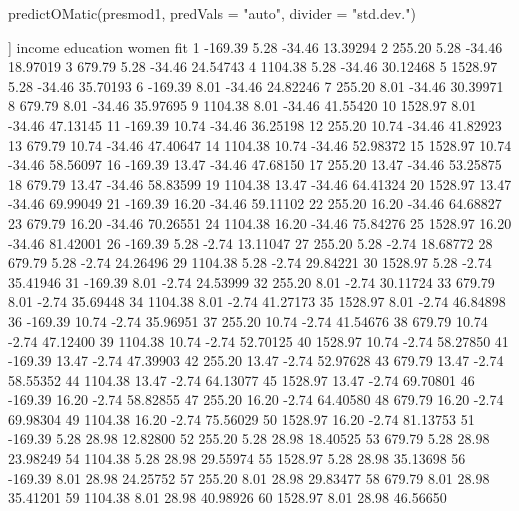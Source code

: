 \begin{Schunk}
\begin{Sinput}
 predictOMatic(presmod1, predVals = "auto", divider = "std.dev.")
\end{Sinput}
\begin{Soutput}
[[1]]
     income education  women      fit
1   -169.39      5.28 -34.46 13.39294
2    255.20      5.28 -34.46 18.97019
3    679.79      5.28 -34.46 24.54743
4   1104.38      5.28 -34.46 30.12468
5   1528.97      5.28 -34.46 35.70193
6   -169.39      8.01 -34.46 24.82246
7    255.20      8.01 -34.46 30.39971
8    679.79      8.01 -34.46 35.97695
9   1104.38      8.01 -34.46 41.55420
10  1528.97      8.01 -34.46 47.13145
11  -169.39     10.74 -34.46 36.25198
12   255.20     10.74 -34.46 41.82923
13   679.79     10.74 -34.46 47.40647
14  1104.38     10.74 -34.46 52.98372
15  1528.97     10.74 -34.46 58.56097
16  -169.39     13.47 -34.46 47.68150
17   255.20     13.47 -34.46 53.25875
18   679.79     13.47 -34.46 58.83599
19  1104.38     13.47 -34.46 64.41324
20  1528.97     13.47 -34.46 69.99049
21  -169.39     16.20 -34.46 59.11102
22   255.20     16.20 -34.46 64.68827
23   679.79     16.20 -34.46 70.26551
24  1104.38     16.20 -34.46 75.84276
25  1528.97     16.20 -34.46 81.42001
26  -169.39      5.28  -2.74 13.11047
27   255.20      5.28  -2.74 18.68772
28   679.79      5.28  -2.74 24.26496
29  1104.38      5.28  -2.74 29.84221
30  1528.97      5.28  -2.74 35.41946
31  -169.39      8.01  -2.74 24.53999
32   255.20      8.01  -2.74 30.11724
33   679.79      8.01  -2.74 35.69448
34  1104.38      8.01  -2.74 41.27173
35  1528.97      8.01  -2.74 46.84898
36  -169.39     10.74  -2.74 35.96951
37   255.20     10.74  -2.74 41.54676
38   679.79     10.74  -2.74 47.12400
39  1104.38     10.74  -2.74 52.70125
40  1528.97     10.74  -2.74 58.27850
41  -169.39     13.47  -2.74 47.39903
42   255.20     13.47  -2.74 52.97628
43   679.79     13.47  -2.74 58.55352
44  1104.38     13.47  -2.74 64.13077
45  1528.97     13.47  -2.74 69.70801
46  -169.39     16.20  -2.74 58.82855
47   255.20     16.20  -2.74 64.40580
48   679.79     16.20  -2.74 69.98304
49  1104.38     16.20  -2.74 75.56029
50  1528.97     16.20  -2.74 81.13753
51  -169.39      5.28  28.98 12.82800
52   255.20      5.28  28.98 18.40525
53   679.79      5.28  28.98 23.98249
54  1104.38      5.28  28.98 29.55974
55  1528.97      5.28  28.98 35.13698
56  -169.39      8.01  28.98 24.25752
57   255.20      8.01  28.98 29.83477
58   679.79      8.01  28.98 35.41201
59  1104.38      8.01  28.98 40.98926
60  1528.97      8.01  28.98 46.56650

\end{Soutput}
\end{Schunk}
